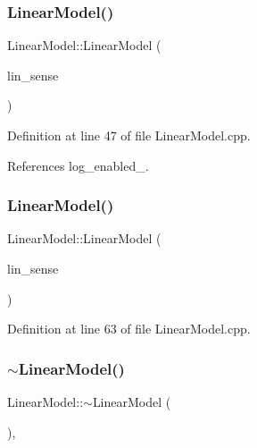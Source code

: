 \subsubsection{\texorpdfstring{Linear\+Model()}{LinearModel()}\hspace{0.1cm}{\footnotesize\ttfamily [4/5]}}
{\footnotesize\ttfamily Linear\+Model\+::\+Linear\+Model (\begin{DoxyParamCaption}\item[{const \mbox{\hyperlink{classbfl_1_1LinearModel}{Linear\+Model}} \&}]{lin\+\_\+sense }\end{DoxyParamCaption})}



Definition at line 47 of file Linear\+Model.\+cpp.



References log\+\_\+enabled\+\_\+.

\mbox{\label{classbfl_1_1LinearModel_a46f1d718d2b8234d714b128a7ce7ce85}} 
\subsubsection{\texorpdfstring{Linear\+Model()}{LinearModel()}\hspace{0.1cm}{\footnotesize\ttfamily [5/5]}}
{\footnotesize\ttfamily Linear\+Model\+::\+Linear\+Model (\begin{DoxyParamCaption}\item[{\mbox{\hyperlink{classbfl_1_1LinearModel}{Linear\+Model}} \&\&}]{lin\+\_\+sense }\end{DoxyParamCaption})\hspace{0.3cm}{\ttfamily [noexcept]}}



Definition at line 63 of file Linear\+Model.\+cpp.

\mbox{\label{classbfl_1_1LinearModel_a5dc0180e77824d11eebda14c84f046ea}} 
\subsubsection{\texorpdfstring{$\sim$\+Linear\+Model()}{~LinearModel()}}
{\footnotesize\ttfamily Linear\+Model\+::$\sim$\+Linear\+Model (\begin{DoxyParamCaption}{ }\end{DoxyParamCaption})\hspace{0.3cm}{\ttfamily [virtual]}, {\ttfamily [noexcept]}}



